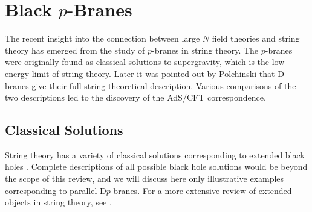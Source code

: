
\section{Black $p$-Branes} 
\label{black_pbranes}

The recent insight into the connection between
large $N$ field theories and string theory has emerged
from the study of $p$-branes in string theory. The $p$-branes 
were originally found as classical solutions to supergravity,
which is the low energy limit of string theory. 
Later it was pointed out by Polchinski that D-branes give
their full string theoretical description. Various comparisons 
of the two descriptions led to the discovery of the AdS/CFT 
correspondence.

\subsection{Classical Solutions}

String theory has a variety of classical solutions corresponding
to extended black holes
\cite{Gibbons:1982ih,Gibbons:1988ps,Callan:1989hs,Dabholkar:1989jt,
Dabholkar:1990yf,Duff:1991wv,Garfinkle:1991qj,Callan:1991dj,Callan:1991ky,
Horowitz:1991cd,Duff:1992pe}. Complete descriptions of all
possible black hole solutions would be beyond the scope of this 
review, and we will discuss here only illustrative examples
corresponding to parallel D$p$ branes. 
For a more extensive review of extended objects in
string theory, see \cite{Duff:1996zn,Peet:1997es}. 

